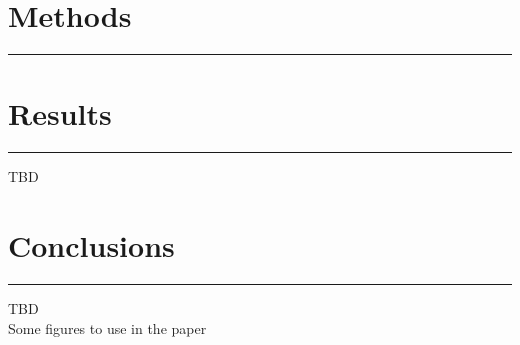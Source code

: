 \documentclass{report}
\begin{document}
\begin{flushleft}
	\section*{Methods}
	\vspace{-0.1cm}\hrule\vspace{0.2cm}
	\section*{Results}
	\vspace{-0.1cm}\hrule\vspace{0.2cm}
	TBD\\
	\section*{Conclusions}
	\vspace{-0.1cm}\hrule\vspace{0.2cm}
	TBD\\
	\pagebreak
	Some figures to use in the paper
	\end{flushleft}
\end{document}
